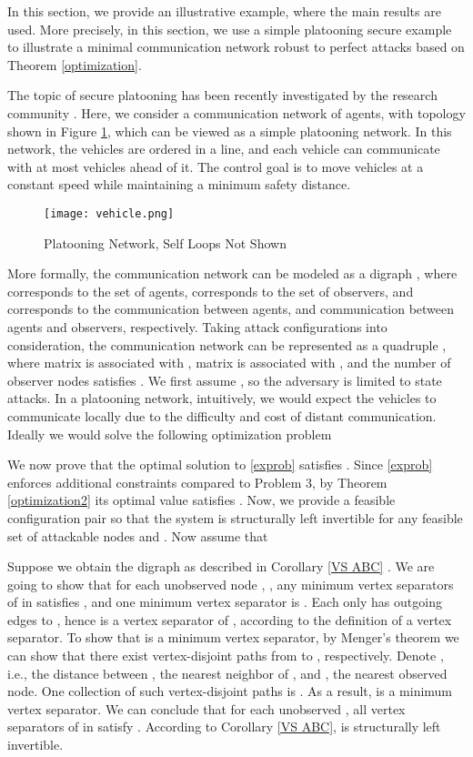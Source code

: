 \documentclass[letterpaper, 10 pt, conference]{ieeeconf}
\begin{document}
In this section, we provide an illustrative example, where the main results are used. More precisely, in this section, we use a simple platooning secure example to illustrate a minimal communication network robust to perfect attacks based on Theorem \ref{optimization}.  

The topic of secure platooning has been recently investigated by the research community \cite{Bruce2015}. Here, we consider a communication network of  agents, with topology shown in Figure \ref{fig:vehicles}, which can be viewed as a simple platooning network. In this network, the vehicles are ordered in a line, and each vehicle can communicate with at most  vehicles ahead of it. The control goal is to move vehicles at a constant speed while maintaining a minimum safety distance.

\begin{figure}[htb]
\centering
\texttt{[image: vehicle.png]}
\caption{Platooning Network, Self Loops Not Shown}
\label{fig:vehicles}
\end{figure}

More formally, the communication network can be modeled as a digraph , where  corresponds to the set of  agents,   corresponds to the set of  observers, and  corresponds to the communication between agents, and communication between agents and observers, respectively. Taking attack configurations into consideration, the communication network can be represented as a quadruple , where matrix  is associated with , matrix  is associated with , and the number of observer nodes satisfies . We first assume , so the adversary is limited to state attacks. In a platooning network, intuitively, we would expect the vehicles to communicate locally due to the difficulty and cost of distant communication. Ideally we would solve the following optimization problem

We now prove that the optimal solution to \eqref{exprob} satisfies . Since \eqref{exprob} enforces additional constraints compared to Problem 3, by Theorem \ref{optimization2} its optimal value satisfies . Now, we provide a feasible configuration pair  so that the system is structurally left invertible for any feasible set of attackable nodes  and . Now assume that

 Suppose we obtain the digraph  as described in Corollary \ref{VS ABC} . We are going to show that for each unobserved node , , any minimum vertex separators  of  in  satisfies , and one minimum vertex separator is . Each  only has outgoing edges to , hence  is a vertex separator of , according to the definition of a vertex separator. To show that  is a minimum vertex separator, by Menger's theorem we can show that there exist  vertex-disjoint paths from  to , respectively. Denote , i.e., the distance between , the nearest neighbor of , and , the nearest observed node. One collection of such vertex-disjoint paths is  . As a result,  is a minimum vertex separator. We can conclude that for each unobserved , all vertex separators  of  in  satisfy . According to Corollary \ref{VS ABC},  is structurally left invertible.
\end{document}
